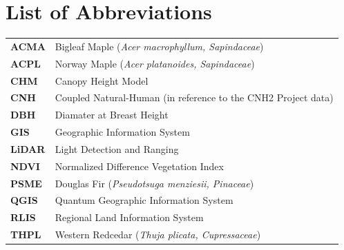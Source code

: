 \documentclass[12pt,twoside]{reedthesis}
\begin{document}
\chapter*{List of Abbreviations}
\begin{table}[h]
    \centering
    \begin{tabular}{ll}
                \textbf{ACMA} & Bigleaf Maple (\textit{Acer macrophyllum, Sapindaceae}) \\
                \textbf{ACPL} & Norway Maple (\textit{Acer platanoides, Sapindaceae}) \\
                \textbf{CHM} & Canopy Height Model \\
                \textbf{CNH} & Coupled Natural-Human (in reference to the CNH2 Project data) \\
                \textbf{DBH} & Diamater at Breast Height \\
                \textbf{GIS} & Geographic Information System \\
                \textbf{LiDAR} & Light Detection and Ranging \\
                \textbf{NDVI} & Normalized Difference Vegetation Index \\
                \textbf{PSME} & Douglas Fir (\textit{Pseudotsuga menziesii, Pinaceae}) \\
                \textbf{QGIS} & Quantum Geographic Information System \\
                \textbf{RLIS} & Regional Land Information System \\
                \textbf{THPL} & Western Redcedar (\textit{Thuja plicata, Cupressaceae}) \\
            \end{tabular}
\end{table}
  \hypersetup{linkcolor=black}
  \setcounter{secnumdepth}{2}
  \setcounter{tocdepth}{2}
  \tableofcontents

  \listoftables
\end{document}
